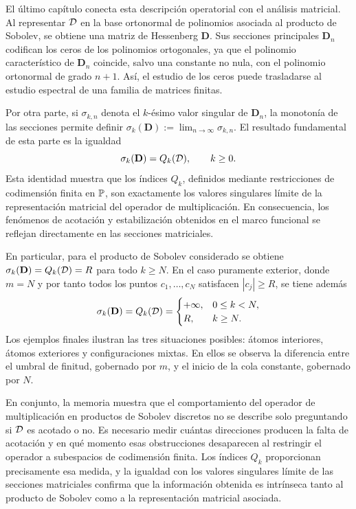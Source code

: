 El último capítulo conecta esta descripción operatorial con el análisis matricial.
Al representar \(\mathcal{D}\) en la base ortonormal de polinomios asociada al producto de
Sobolev, se obtiene una matriz de Hessenberg \(\mathbf D\). Sus secciones
principales \(\mathbf D_n\) codifican los ceros de los polinomios ortogonales, ya
que el polinomio característico de \(\mathbf D_n\) coincide, salvo una constante
no nula, con el polinomio ortonormal de grado \(n+1\). Así, el estudio de los
ceros puede trasladarse al estudio espectral de una familia de matrices finitas.

Por otra parte, si \(\sigma_{k,n}\) denota el \(k\)-ésimo valor singular de
\(\mathbf D_n\), la monotonía de las secciones permite definir
\(\sigma_k(\mathbf D):=\lim_{n\to\infty}\sigma_{k,n}\).
El resultado fundamental de esta parte es la igualdad
\[
	\sigma_k(\mathbf D)=Q_k(\mathcal{D}),
	\qquad k\ge0.
\]
Esta identidad muestra que los índices \(Q_k\), definidos mediante restricciones
de codimensión finita en \(\mathbb{P}\), son exactamente los valores singulares límite
de la representación matricial del operador de multiplicación. En consecuencia,
los fenómenos de acotación y estabilización obtenidos en el marco funcional se
reflejan directamente en las secciones matriciales.

En particular, para el producto de Sobolev considerado se obtiene
\(\sigma_k(\mathbf D)=Q_k(\mathcal{D})=R\) para todo \(k\ge N\).
En el caso puramente exterior, donde \(m=N\) y por tanto todos los puntos
\(c_1,\dots,c_N\) satisfacen \(|c_j|\ge R\), se tiene además
\[
	\sigma_k(\mathbf D)=Q_k(\mathcal{D})=
	\begin{cases}
		+\infty, & 0\le k<N, \\
		R,       & k\ge N.
	\end{cases}
\]
Los ejemplos finales ilustran las tres situaciones posibles: átomos interiores,
átomos exteriores y configuraciones mixtas. En ellos se observa la diferencia
entre el umbral de finitud, gobernado por \(m\), y el inicio de la cola constante,
gobernado por \(N\).

En conjunto, la memoria muestra que el comportamiento del operador de
multiplicación en productos de Sobolev discretos no se describe solo preguntando
si \(\mathcal{D}\) es acotado o no. Es necesario medir cuántas direcciones producen la falta
de acotación y en qué momento esas obstrucciones desaparecen al restringir el
operador a subespacios de codimensión finita. Los índices \(Q_k\) proporcionan
precisamente esa medida, y la igualdad con los valores singulares límite de las
secciones matriciales confirma que la información obtenida es intrínseca tanto al
producto de Sobolev como a la representación matricial asociada.

